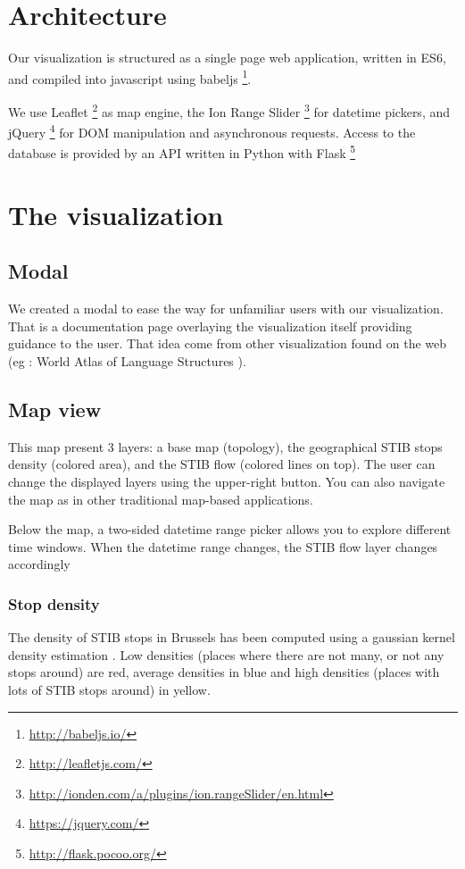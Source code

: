 \documentclass[11pt]{article}%
\begin{document}
\section{Architecture}
Our visualization is structured as a single page web application, written in ES6, and compiled into javascript using babeljs \footnote{\url{http://babeljs.io/}}.

We use Leaflet \footnote{\url{http://leafletjs.com/}} as map engine, the Ion Range Slider \footnote{\url{http://ionden.com/a/plugins/ion.rangeSlider/en.html}} for datetime pickers, and jQuery \footnote{\url{https://jquery.com/}} for DOM manipulation and asynchronous requests. Access to the database is provided by an API written in Python with Flask \footnote{\url{http://flask.pocoo.org/}}

\section{The visualization}

\subsection{Modal}

We created a modal to ease the way for unfamiliar users with our visualization. That is a documentation page overlaying the visualization itself providing guidance to the user. That idea come from other visualization found on the web (eg : World Atlas of Language Structures \cite{visuawithmodal}).


\subsection{Map view}

This map present 3 layers: a base map (topology), the geographical STIB stops density (colored area), and the STIB flow (colored lines on top). The user can change the displayed layers using the upper-right button. You can also navigate the map as in other traditional map-based applications.

Below the map, a two-sided datetime range picker allows you to explore different time windows. When the datetime range changes, the STIB flow layer changes accordingly

\subsubsection{Stop density}
The density of STIB stops in Brussels has been computed using a gaussian kernel density estimation \cite{kdewiki}. Low densities (places where there are not many, or not any stops around) are red, average densities in blue and high densities (places with lots of STIB stops around) in yellow.
\end{document}
